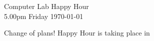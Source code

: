 \documentclass[a4paper,landscape]{article}
\begin{document}
\thispagestyle{empty}

\begin{center}

    {\huge Computer Lab Happy Hour} \\ \bigskip
    {\Large 5.00pm Friday \today}

    \vfill

    {\Huge Change of plans! Happy Hour is taking place in} \\ \bigskip \bigskip
     \\ \bigskip \bigskip \bigskip

    \vfill


\end{center}

\medskip
\end{document}
